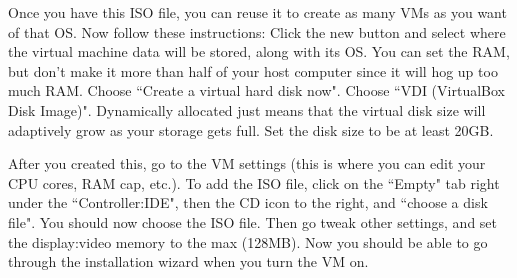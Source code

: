\documentclass{article}
\begin{document}
  Once you have this ISO file, you can reuse it to create as many VMs as you want of that OS. Now follow these instructions: Click the new button and select where the virtual machine data will be stored, along with its OS. You can set the RAM, but don't make it more than half of your host computer since it will hog up too much RAM. Choose ``Create a virtual hard disk now". Choose ``VDI (VirtualBox Disk Image)". Dynamically allocated just means that the virtual disk size will adaptively grow as your storage gets full. Set the disk size to be at least 20GB. 

  After you created this, go to the VM settings (this is where you can edit your CPU cores, RAM cap, etc.). To add the ISO file, click on the ``Empty" tab right under the ``Controller:IDE", then the CD icon to the right, and ``choose a disk file". You should now choose the ISO file. Then go tweak other settings, and set the display:video memory to the max (128MB). Now you should be able to go through the installation wizard when you turn the VM on. 
\end{document}
